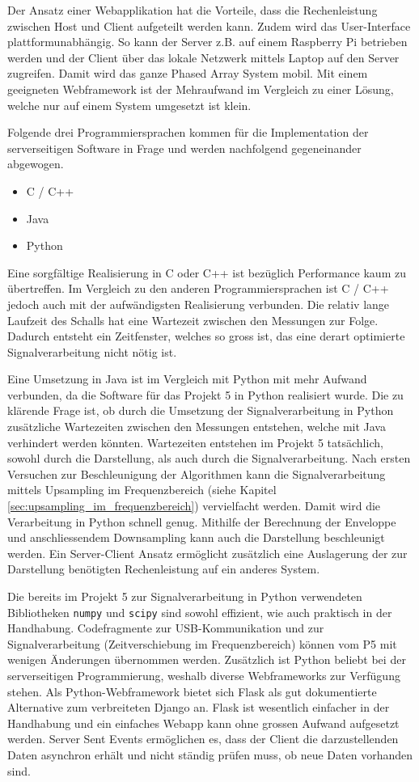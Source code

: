 Der Ansatz einer Webapplikation hat die Vorteile, dass die Rechenleistung zwischen Host und Client aufgeteilt werden kann. Zudem wird das User-Interface plattformunabhängig. So kann der Server z.B. auf einem Raspberry Pi betrieben werden und der Client über das lokale Netzwerk mittels Laptop auf den Server zugreifen. Damit wird das ganze Phased Array System mobil. Mit einem geeigneten Webframework ist der Mehraufwand im Vergleich zu einer Lösung, welche nur auf einem System umgesetzt ist klein.

Folgende drei Programmiersprachen kommen für die Implementation der serverseitigen Software in Frage und werden nachfolgend gegeneinander abgewogen.

\begin{itemize}
	\item C / C++
	\item Java
	\item Python
\end{itemize}

Eine sorgfältige Realisierung in C oder C++ ist bezüglich Performance kaum zu übertreffen. Im Vergleich zu den anderen Programmiersprachen ist C / C++ jedoch auch mit der aufwändigsten Realisierung verbunden. Die relativ lange Laufzeit des Schalls hat eine Wartezeit zwischen den Messungen zur Folge. Dadurch entsteht ein Zeitfenster, welches so gross ist, das eine derart optimierte Signalverarbeitung nicht nötig ist.

Eine Umsetzung in Java ist im Vergleich mit Python mit mehr Aufwand verbunden, da die Software für das Projekt 5 in Python realisiert wurde. Die zu klärende Frage ist, ob durch die Umsetzung der Signalverarbeitung in Python zusätzliche Wartezeiten zwischen den Messungen entstehen, welche mit Java verhindert werden könnten.
Wartezeiten entstehen im Projekt 5 tatsächlich, sowohl durch die Darstellung, als auch durch die Signalverarbeitung. Nach ersten Versuchen zur Beschleunigung der Algorithmen kann die Signalverarbeitung mittels Upsampling im Frequenzbereich (siehe Kapitel \ref{sec:upsampling_im_frequenzbereich}) vervielfacht werden. Damit wird die Verarbeitung in Python schnell genug. Mithilfe der Berechnung der Enveloppe und anschliessendem Downsampling kann auch die Darstellung beschleunigt werden. Ein Server-Client Ansatz ermöglicht zusätzlich eine Auslagerung der zur Darstellung benötigten Rechenleistung auf ein anderes System.

Die bereits im Projekt 5 zur Signalverarbeitung in Python verwendeten Bibliotheken \texttt{numpy} und \texttt{scipy} sind sowohl effizient, wie auch praktisch in der Handhabung. Codefragmente zur USB-Kommunikation und zur Signalverarbeitung (Zeitverschiebung im Frequenzbereich) können vom P5 mit wenigen Änderungen übernommen werden.
Zusätzlich ist Python beliebt bei der serverseitigen Programmierung, weshalb diverse Webframeworks zur Verfügung stehen. Als Python-Webframework bietet sich Flask als gut dokumentierte Alternative zum verbreiteten Django an. Flask ist wesentlich einfacher in der Handhabung und ein einfaches Webapp kann ohne grossen Aufwand aufgesetzt werden.
Server Sent Events ermöglichen es, dass der Client die darzustellenden Daten asynchron erhält und nicht ständig prüfen muss, ob neue Daten vorhanden sind.


